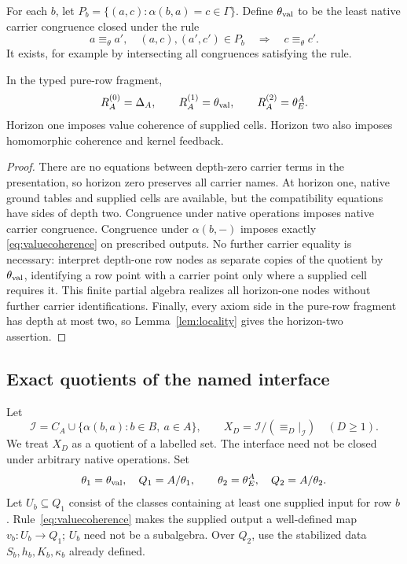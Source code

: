 For each $b$, let $P_b=\{(a,c):\alpha(b,a)=c\in\Gamma\}$.
Define $\theta_{\rm val}$ to be the least native carrier congruence closed
under the rule
\begin{equation}\label{eq:valuecoherence}
a\equiv_\theta a',\quad (a,c),(a',c')\in P_b
\quad\Longrightarrow\quad c\equiv_\theta c'.
\end{equation}
It exists, for example by intersecting all congruences satisfying the rule.

\begin{theorem}\label{thm:horizons}
In the typed pure-row fragment,
\[
R_A^{(0)}=\Delta_A,\qquad
R_A^{(1)}=\theta_{\rm val},\qquad
R_A^{(2)}=\theta_E^A.
\]
Horizon one imposes value coherence of supplied cells. Horizon two also
imposes homomorphic coherence and kernel feedback.
\end{theorem}

\begin{proof}
There are no equations between depth-zero carrier terms in the presentation,
so horizon zero preserves all carrier names. At horizon one, native ground
tables and supplied cells are available, but the compatibility equations
have sides of depth two. Congruence under native operations imposes native
carrier congruence. Congruence under $\alpha(b,-)$ imposes exactly
\eqref{eq:valuecoherence} on prescribed outputs. No further carrier equality
is necessary: interpret depth-one row nodes as separate copies of the
quotient by $\theta_{\rm val}$, identifying a row point with a carrier point
only where a supplied cell requires it. This finite partial algebra realizes
all horizon-one nodes without further carrier identifications.
Finally, every axiom side in the pure-row fragment has depth at most two,
so Lemma~\ref{lem:locality} gives the horizon-two assertion.
\end{proof}

\subsection{Exact quotients of the named interface}

Let
\[
\mathcal I=C_A\cup\{\alpha(b,a):b\in B,\ a\in A\},\qquad
X_D=\mathcal I/(\equiv_D|_{\mathcal I})\quad(D\ge1).
\]
We treat $X_D$ as a quotient of a labelled set. The interface need not be
closed under arbitrary native operations. Set
\[
\theta_1=\theta_{\rm val},\quad Q_1=A/\theta_1,
\qquad \theta_2=\theta_E^A,\quad Q_2=A/\theta_2.
\]
Let $U_b\subseteq Q_1$ consist of the classes containing at least one
supplied input for row $b$. Rule~\eqref{eq:valuecoherence} makes the supplied
output a well-defined map $v_b:U_b\to Q_1$; $U_b$ need not be a subalgebra.
Over $Q_2$, use the stabilized data $S_b,h_b,K_b,\kappa_b$ already defined.

